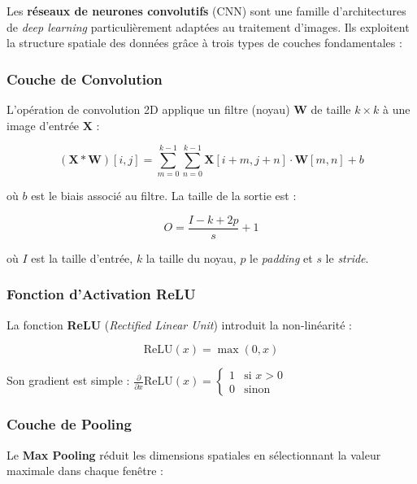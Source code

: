 \documentclass[12pt,a4paper,twoside]{report}
\newcommand{\keyword}[1]{\textbf{\textcolor{stellantisblue}{#1}}}
\begin{document}
Les \keyword{réseaux de neurones convolutifs} (CNN) \cite{lecun1998, goodfellow2016} sont une famille d'architectures de \textit{deep learning} particulièrement adaptées au traitement d'images. Ils exploitent la structure spatiale des données grâce à trois types de couches fondamentales :

\subsubsection{Couche de Convolution}

L'opération de convolution 2D applique un filtre (noyau) $\mathbf{W}$ de taille $k \times k$ à une image d'entrée $\mathbf{X}$ :

\begin{equation}
(\mathbf{X} * \mathbf{W})[i, j] = \sum_{m=0}^{k-1} \sum_{n=0}^{k-1} \mathbf{X}[i+m, j+n] \cdot \mathbf{W}[m, n] + b
\label{eq:conv2d}
\end{equation}

où $b$ est le biais associé au filtre. La taille de la sortie est :

\begin{equation}
O = \frac{I - k + 2p}{s} + 1
\label{eq:output_size}
\end{equation}

où $I$ est la taille d'entrée, $k$ la taille du noyau, $p$ le \textit{padding} et $s$ le \textit{stride}.

\subsubsection{Fonction d'Activation ReLU}

La fonction \keyword{ReLU} (\textit{Rectified Linear Unit}) introduit la non-linéarité :

\begin{equation}
\text{ReLU}(x) = \max(0, x)
\label{eq:relu}
\end{equation}

Son gradient est simple : $\frac{\partial}{\partial x} \text{ReLU}(x) = \begin{cases} 1 & \text{si } x > 0 \\ 0 & \text{sinon} \end{cases}$

\subsubsection{Couche de Pooling}

Le \keyword{Max Pooling} réduit les dimensions spatiales en sélectionnant la valeur maximale dans chaque fenêtre :
\end{document}
